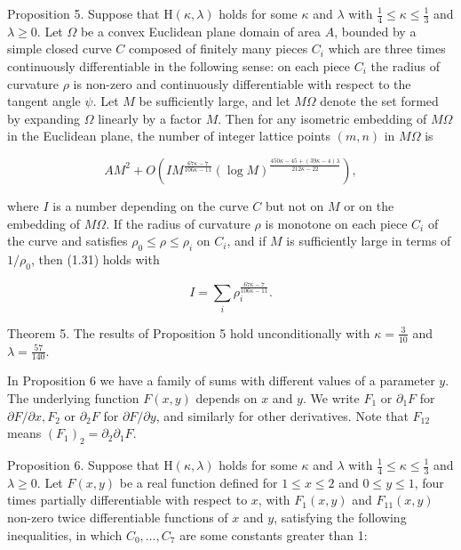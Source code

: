 \documentclass[10pt]{article}
\begin{document}
Proposition 5. Suppose that $\mathrm{H}(\kappa, \lambda)$ holds for some $\kappa$ and $\lambda$ with $\frac{1}{4} \leqslant \kappa \leqslant \frac{1}{3}$ and $\lambda \geqslant 0$. Let $\Omega$ be a convex Euclidean plane domain of area $A$, bounded by a simple closed curve $C$ composed of finitely many pieces $C_{i}$ which are three times continuously differentiable in the following sense: on each piece $C_{i}$ the radius of curvature $\rho$ is non-zero and continuously differentiable with respect to the tangent angle $\psi$. Let $M$ be sufficiently large, and let $M \Omega$ denote the set formed by expanding $\Omega$ linearly by a factor $M$. Then for any isometric embedding of $M \Omega$ in the Euclidean plane, the number of integer lattice points $(m, n)$ in $M \Omega$ is


\begin{equation*}
A M^{2}+O\left(I M^{\frac{67 \kappa-7}{106 \kappa-11}}(\log M)^{\frac{450 \kappa-45+(39 \kappa-4) \lambda}{212 \kappa-22}}\right), \tag{1.31}
\end{equation*}


where $I$ is a number depending on the curve $C$ but not on $M$ or on the embedding of $M \Omega$. If the radius of curvature $\rho$ is monotone on each piece $C_{i}$ of the curve and satisfies $\rho_{0} \leqslant \rho \leqslant \rho_{i}$ on $C_{i}$, and if $M$ is sufficiently large in terms of $1 / \rho_{0}$, then (1.31) holds with

$$
I=\sum_{i} \rho_{i}^{\frac{67 \kappa-7}{106 \kappa-11}}.
$$

Theorem 5. The results of Proposition 5 hold unconditionally with $\kappa=\frac{3}{10}$ and $\lambda=\frac{57}{140}$.

In Proposition 6 we have a family of sums with different values of a parameter $y$. The underlying function $F(x, y)$ depends on $x$ and $y$. We write $F_{1}$ or $\partial_{1} F$ for $\partial F / \partial x, F_{2}$ or $\partial_{2} F$ for $\partial F / \partial y$, and similarly for other derivatives. Note that $F_{12}$ means $\left(F_{1}\right)_{2}=\partial_{2} \partial_{1} F$.

Proposition 6. Suppose that $\mathrm{H}(\kappa, \lambda)$ holds for some $\kappa$ and $\lambda$ with $\frac{1}{4} \leqslant \kappa \leqslant \frac{1}{3}$ and $\lambda \geqslant 0$. Let $F(x, y)$ be a real function defined for $1 \leqslant x \leqslant 2$ and $0 \leqslant y \leqslant 1$, four times partially differentiable with respect to $x$, with $F_{1}(x, y)$ and $F_{11}(x, y)$ non-zero twice differentiable functions of $x$ and $y$, satisfying the following inequalities, in which $C_{0}, \ldots, C_{7}$ are some constants greater than 1:
\end{document}
